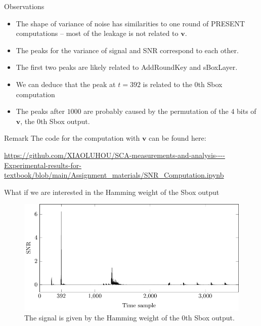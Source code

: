 \begin{frame}{Observations}
    \begin{itemize}
        \item The shape of variance of noise has similarities to one round of PRESENT computations -- most of the leakage is not related to $\boldsymbol{v}$. 
        \item The peaks for the variance of signal and SNR correspond to each other.
        \item The first two peaks are likely related to AddRoundKey and sBoxLayer.
        \item We can deduce that the peak at $t=392$ is related to the $0$th Sbox computation
       \item The peaks after $1000$ are probably caused by the permutation of the $4$ bits of $\boldsymbol{v}$, the $0$th Sbox output.
    \end{itemize}
\begin{alertblock}{Remark}
    The code for the computation with $\boldsymbol{v}$ can be found here:
    \begin{center}
    \url{https://github.com/XIAOLUHOU/SCA-measurements-and-analysis----Experimental-results-for-textbook/blob/main/Assignment_materials/SNR_Computation.ipynb}
    \end{center}
\end{alertblock}
\end{frame}

\begin{frame}{What if we are interested in the Hamming weight of the Sbox output}
    \begin{figure} 
        \centering
        \includegraphics{fig/SNR_hw.pdf}
        \caption{
        The signal is given by the Hamming weight of the $0$th Sbox output.}
    \end{figure}
\end{frame}


